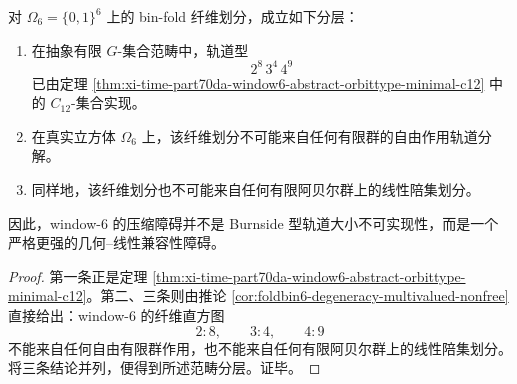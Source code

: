 \begin{corollary}\label{cor:xi-time-part70da-window6-obstruction-geometric-not-burnside}
对 \(\Omega_6=\{0,1\}^6\) 上的 bin-fold 纤维划分，成立如下分层：
\begin{enumerate}
  \item 在抽象有限 \(G\)-集合范畴中，轨道型
  \[
  2^8\,3^4\,4^9
  \]
  已由定理 \ref{thm:xi-time-part70da-window6-abstract-orbittype-minimal-c12} 中的 \(C_{12}\)-集合实现。
  \item 在真实立方体 \(\Omega_6\) 上，该纤维划分不可能来自任何有限群的自由作用轨道分解。
  \item 同样地，该纤维划分也不可能来自任何有限阿贝尔群上的线性陪集划分。
\end{enumerate}
因此，window-\(6\) 的压缩障碍并不是 Burnside 型轨道大小不可实现性，而是一个严格更强的几何--线性兼容性障碍。
\end{corollary}
\begin{proof}
第一条正是定理 \ref{thm:xi-time-part70da-window6-abstract-orbittype-minimal-c12}。第二、三条则由推论 \ref{cor:foldbin6-degeneracy-multivalued-nonfree} 直接给出：window-\(6\) 的纤维直方图
\[
2:8,\qquad 3:4,\qquad 4:9
\]
不能来自任何自由有限群作用，也不能来自任何有限阿贝尔群上的线性陪集划分。将三条结论并列，便得到所述范畴分层。证毕。
\end{proof}

\endinput
